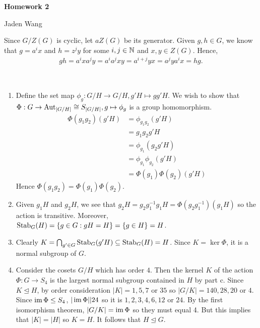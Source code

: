 \documentclass[12pt]{article}
\begin{document}
\centerline {\textsf{\textbf{\LARGE{Homework 2}}}}
\centerline {Jaden Wang}
\vspace{.15in}

\begin{problem}[1]
Since $ G /Z(G)$ is cyclic, let $a Z(G)$ be its generator. Given $ g,h \in G$, we know that $ g = a^{i} x$ and $ h = z^{j} y$ for some $ i,j \in \mathbb{N}$ and $ x,y \in Z(G)$. Hence,
\begin{align*}
	gh = a^{i}xa^{j}y = a^{i}a^{j}xy= a^{i+j} yx= a^{j} y a^{i}x = hg.
\end{align*}
\end{problem}

\begin{problem}[2]
~\begin{enumerate}[label=(\alph*)]
	\item Define the set map $ \phi_g: G /H \to G /H, g'H \mapsto g g'H $. We wish to show that $ \Phi: G \to \operatorname{Aut}_{|G /H|} \cong S_{|G /H|}, g \mapsto \phi_g$ is a group homomorphism.
		\begin{align*}
			\Phi(g_1g_2)(g'H) &= \phi_{g_1 g_2}(g'H) \\
			&= g_1 g_2 g' H \\
			&= \phi_{g_1}(g_2 g' H) \\
			&= \phi_{g_1} \phi_{g_2}(g'H)\\
			&= \Phi(g_1) \Phi(g_2) (g'H) 
		\end{align*}
	Hence $ \Phi(g_1 g_2) = \Phi(g_1) \Phi(g_2)$.
\item Given $ g_1 H$ and $ g_2 H$, we see that $g_2 H = g_2 g_1 ^{-1} g_1H = \Phi(g_2 g_1 ^{-1})(g_1 H)$ so the action is transitive. Moreover, $ \operatorname{Stab}_{ G}( H) = \{g \in G: gH = H\} = \{g \in H\} =H$.
\item Clearly $ K= \bigcap_{ g' \in G} \operatorname{Stab}_{ G}( g'H) \subseteq \operatorname{Stab}_{ G}( H) = H$. Since $ K = \ker \Phi$, it is a normal subgroup of $ G$. 
\item  Consider the cosets $ G /H$ which has order  $ 4$. Then the kernel $ K$ of the action  $ \Phi: G \to S_4$ is the largest normal subgroup contained in $ H$ by part c. Since $ K \trianglelefteq H$, by order consideration $ |K| = 1,5,7$ or  $ 35$ so $ |G /K| = 140,28,20$ or $4$. Since $ \operatorname{im} \Phi \leq S_4$, $ |\operatorname{im} \Phi| | 24$ so it is $ 1,2,3,4,6,12$ or  $ 24$. By the first isomorphism theorem, $ |G /K| = \operatorname{im} \Phi$ so they must equal 4. But this implies that $ |K| = |H|$ so  $ K = H$. It follows that  $ H \trianglelefteq G$.
\end{enumerate}
\end{problem}
\end{document}
